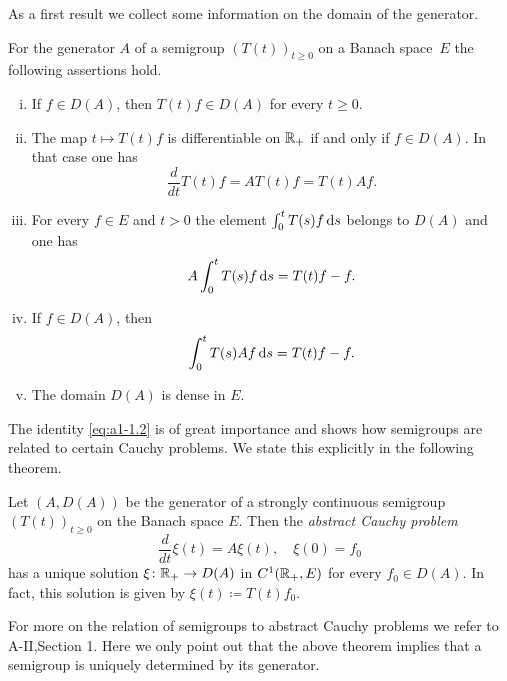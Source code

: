 As a first result we collect some information on the domain of the generator.
\begin{proposition}\label{prop:a1-1.6}
For the generator $A$ of a semigroup $(T(t))_{t \geq 0}$ on a Banach space~$E$ the following assertions hold.
\begin{enumerate}[(i)]
\item
If $f \in D(A)$, then $T(t)f \in D(A)$ for every $t \geq 0$.

\item
The map $t \mapsto T(t)f$ is differentiable on $\mathbb{R}_{+}$ if and only if $f \in D(A)$.
In that case one has
\begin{equation}\label{eq:a1-1.2}
    \frac{d}{dt} T(t)f = AT(t)f = T(t)Af .
\end{equation}
\item
For every $f \in E$ and $t > 0$ the element $\int_0^t T(s)f\mathop{}\!\mathrm{d}{s}$ belongs to $D(A)$ and one has
\begin{equation}\label{eq:a1-1.3}
    A\int_0^t T(s)f \mathop{}\!\mathrm{d}{s} = T(t)f - f  .
\end{equation}
\item
If $f \in D(A)$, then
\begin{equation}\label{eq:a1-1.4}
    \int_0^t T(s)Af \mathop{}\!\mathrm{d}{s} = T(t)f - f  .
\end{equation}

\item
The domain $D(A)$ is dense in $E$.
\end{enumerate}
\end{proposition}
The identity \eqref{eq:a1-1.2} is of great importance and shows how semigroups are related to certain Cauchy problems.
We state this explicitly in the following theorem.
\begin{theorem}\label{thm:a1-1.7}
Let $(A,D(A))$ be the generator of a strongly continuous semigroup $(T(t))_{t \geq 0}$ on the Banach space $E$.
Then the \emph{abstract Cauchy problem}
\begin{equation}\label{eq:a1-1.5}
\frac{d}{dt}\xi(t) = A\xi(t), \quad \xi(0) = f_{0}
\end{equation}
has a unique solution $\xi \colon \mathbb{R}_{+} \to D(A)$ in $C^1(\mathbb{R}_{+},E)$ for every $f_{0} \in D(A)$.
In fact, this solution is given by $\xi(t) \coloneqq T(t)f_{0}$.
\end{theorem}
For more on the relation of semigroups to abstract Cauchy problems we refer to A-II,Section 1.
Here we only point out that the above theorem implies that a semigroup is uniquely determined by its generator.

